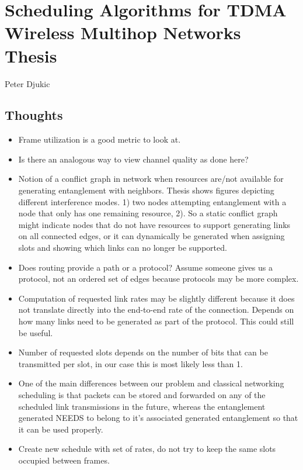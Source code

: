 \documentclass{article}
\begin{document}
\section{Scheduling Algorithms for TDMA Wireless Multihop Networks Thesis}
Peter Djukic

\subsection{Thoughts}
\begin{itemize}
    \item Frame utilization is a good metric to look at.
    \item Is there an analogous way to view channel quality as done here?
    \item Notion of a conflict graph in network when resources are/not available for generating entanglement with neighbors.  Thesis shows figures depicting different interference modes.  1) two nodes attempting entanglement with a node that only has one remaining resource, 2). So a static conflict graph might indicate nodes that do not have resources to support generating links on all connected edges, or it can dynamically be generated when assigning slots and showing which links can no longer be supported.
    \item Does routing provide a path or a protocol?  Assume someone gives us a protocol, not an ordered set of edges because protocols may be more complex.
    \item Computation of requested link rates may be slightly different because it does not translate directly into the end-to-end rate of the connection.  Depends on how many links need to be generated as part of the protocol.  This could still be useful.
    \item Number of requested slots depends on the number of bits that can be transmitted per slot, in our case this is most likely less than 1.
    \item One of the main differences between our problem and classical networking scheduling is that packets can be stored and forwarded on any of the scheduled link transmissions in the future, whereas the entanglement generated NEEDS to belong to it's associated generated entanglement so that it can be used properly.
    \item Create new schedule with set of rates, do not try to keep the same slots occupied between frames.
\end{itemize}
\end{document}
